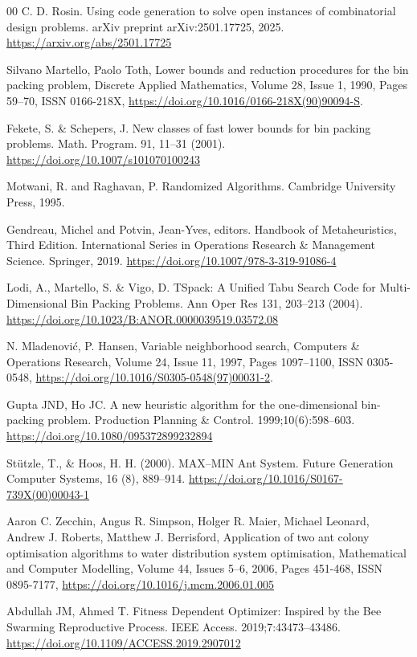 \documentclass[11pt]{article}
\begin{document}
\begin{thebibliography}{00}
 C. D. Rosin. Using code generation to solve open instances of combinatorial design problems. arXiv preprint arXiv:2501.17725, 2025. \url{https://arxiv.org/abs/2501.17725}

 Silvano Martello, Paolo Toth, Lower bounds and reduction procedures for the bin packing problem, Discrete Applied Mathematics, Volume 28, Issue 1, 1990, Pages 59--70, ISSN 0166-218X, \url{https://doi.org/10.1016/0166-218X(90)90094-S}.

 Fekete, S. \& Schepers, J. New classes of fast lower bounds for bin packing problems. Math. Program. 91, 11--31 (2001). \url{https://doi.org/10.1007/s101070100243}

 Motwani, R. and Raghavan, P. Randomized Algorithms. Cambridge University Press, 1995.

 Gendreau, Michel and Potvin, Jean-Yves, editors. Handbook of Metaheuristics, Third Edition. International Series in Operations Research \& Management Science. Springer, 2019. \url{https://doi.org/10.1007/978-3-319-91086-4}

 Lodi, A., Martello, S. \& Vigo, D. TSpack: A Unified Tabu Search Code for Multi-Dimensional Bin Packing Problems. Ann Oper Res 131, 203–213 (2004). \url{https://doi.org/10.1023/B:ANOR.0000039519.03572.08}

 N. Mladenovi{\'c}, P. Hansen, Variable neighborhood search, Computers \& Operations Research, Volume 24, Issue 11, 1997, Pages 1097--1100, ISSN 0305-0548, \url{https://doi.org/10.1016/S0305-0548(97)00031-2}.

 Gupta JND, Ho JC. A new heuristic algorithm for the one-dimensional bin-packing problem. Production Planning \& Control. 1999;10(6):598--603. \url{https://doi.org/10.1080/095372899232894}

 Stützle, T., \& Hoos, H. H. (2000). MAX–MIN Ant System. Future Generation Computer Systems, 16 (8), 889--914. \url{https://doi.org/10.1016/S0167-739X(00)00043-1}

 Aaron C. Zecchin, Angus R. Simpson, Holger R. Maier, Michael Leonard, Andrew J. Roberts, Matthew J. Berrisford, Application of two ant colony optimisation algorithms to water distribution system optimisation, Mathematical and Computer Modelling, Volume 44, Issues 5–6, 2006, Pages 451-468, ISSN 0895-7177, \url{https://doi.org/10.1016/j.mcm.2006.01.005}

 Abdullah JM, Ahmed T. Fitness Dependent Optimizer: Inspired by the Bee Swarming Reproductive Process. IEEE Access. 2019;7:43473--43486. \url{https://doi.org/10.1109/ACCESS.2019.2907012}


\end{thebibliography}
\end{document}
